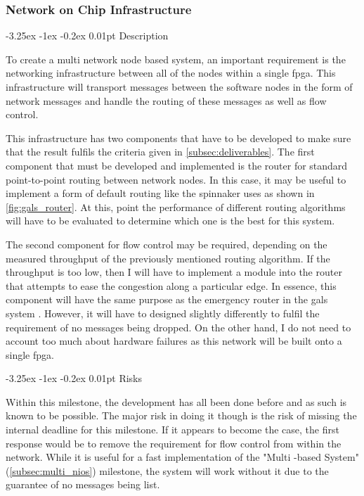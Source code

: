 \documentclass[paper=a4, fontsize=11pt, bibliography=totocnumbered]{scrartcl}
\makeatletter
\renewcommand\paragraph{\@startsection{paragraph}{4}{\z@}%
  {-3.25ex \@plus -1ex \@minus -0.2ex}%
  {0.01pt}%
  {\raggedsection\normalfont\sectfont\nobreak\size@paragraph}%
}
\numberwithin{equation}{section}		%
\numberwithin{figure}{section}			%
\numberwithin{table}{section}				%
\makeatother
\begin{document}
\subsubsection{Network on Chip Infrastructure}

\paragraph{Description}

To create a multi \gls{network node} based system, an important requirement is the networking infrastructure between all of the nodes within a single \gls{fpga}. This infrastructure will transport \glspl{message} between the \glspl{software node} in the form of network \glspl{message} and handle the routing of these \glspl{message} as well as flow control.

This infrastructure has two components that have to be developed to make sure that the result fulfils the criteria given in \cref{subsec:deliverables}. The first component that must be developed and implemented is the router for standard point-to-point routing between \glspl{network node}. In this case, it may be useful to implement a form of default routing like the \gls{spinnaker} uses as shown in \cref{fig:gals_router}. At this, point the performance of different routing algorithms will have to be evaluated to determine which one is the best for this system.

The second component for flow control may be required, depending on the measured throughput of the previously mentioned routing algorithm. If the throughput is too low, then I will have to implement a module into the router that attempts to ease the congestion along a particular \gls{edge}. In essence, this component will have the same purpose as the emergency router in the \gls{gals} system \cite{art:1_plana_furber_temple_khan_shi_wu_yang_2007}. However, it will have to designed slightly differently to fulfil the requirement of no \glspl{message} being dropped. On the other hand, I do not need to account too much about hardware failures as this network will be built onto a single \gls{fpga}.

\paragraph{Risks}

Within this milestone, the development has all been done before and as such is known to be possible. The major risk in doing it though is the risk of missing the internal deadline for this milestone. If it appears to become the case, the first response would be to remove the requirement for flow control from within the network. While it is useful for a fast implementation of the "Multi -based  System" (\cref{subsec:multi_nios}) milestone, the system will work without it due to the guarantee of no \glspl{message} being list.
\end{document}

